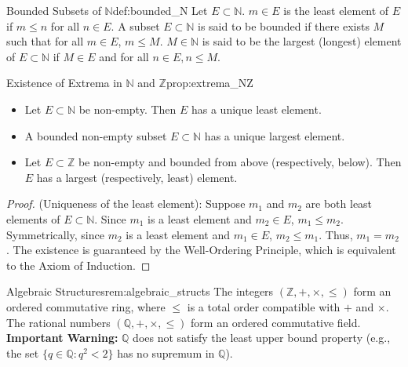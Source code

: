 \documentclass[11pt, a4paper]{article}
\begin{document}
\begin{definition}{Bounded Subsets of $\mathbb{N}$}{def:bounded_N}
Let $E \subset \mathbb{N}$. $m \in E$ is the least element of $E$ if $m \le n$ for all $n \in E$. A subset $E \subset \mathbb{N}$ is said to be bounded if there exists $M$ such that for all $m \in E$, $m \le M$. $M \in \mathbb{N}$ is said to be the largest (longest) element of $E \subset \mathbb{N}$ if $M \in E$ and for all $n \in E, n \le M$.
\end{definition}

\begin{proposition}{Existence of Extrema in $\mathbb{N}$ and $\mathbb{Z}$}{prop:extrema_NZ}
\begin{itemize}
    \item Let $E \subset \mathbb{N}$ be non-empty. Then $E$ has a unique least element.
    \item A bounded non-empty subset $E \subset \mathbb{N}$ has a unique largest element.
    \item Let $E \subset \mathbb{Z}$ be non-empty and bounded from above (respectively, below). Then $E$ has a largest (respectively, least) element.
\end{itemize}
\end{proposition}
\begin{proof}
(Uniqueness of the least element): Suppose $m_1$ and $m_2$ are both least elements of $E \subset \mathbb{N}$. Since $m_1$ is a least element and $m_2 \in E$, $m_1 \le m_2$. Symmetrically, since $m_2$ is a least element and $m_1 \in E$, $m_2 \le m_1$. Thus, $m_1 = m_2$. The existence is guaranteed by the Well-Ordering Principle, which is equivalent to the Axiom of Induction.
\end{proof}

\begin{remark}{Algebraic Structures}{rem:algebraic_structs}
The integers $(\mathbb{Z}, +, \times, \le)$ form an ordered commutative ring, where $\le$ is a total order compatible with $+$ and $\times$. The rational numbers $(\mathbb{Q}, +, \times, \le)$ form an ordered commutative field.
\textbf{Important Warning:} $\mathbb{Q}$ does not satisfy the least upper bound property (e.g., the set $\{q \in \mathbb{Q} : q^2 < 2\}$ has no supremum in $\mathbb{Q}$).
\end{remark}
\end{document}
